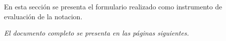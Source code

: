 
En esta sección se presenta el formulario realizado como instrumento de evaluación de la notacion.

\vfill

\textit{El documento completo se presenta en las páginas siguientes.}
